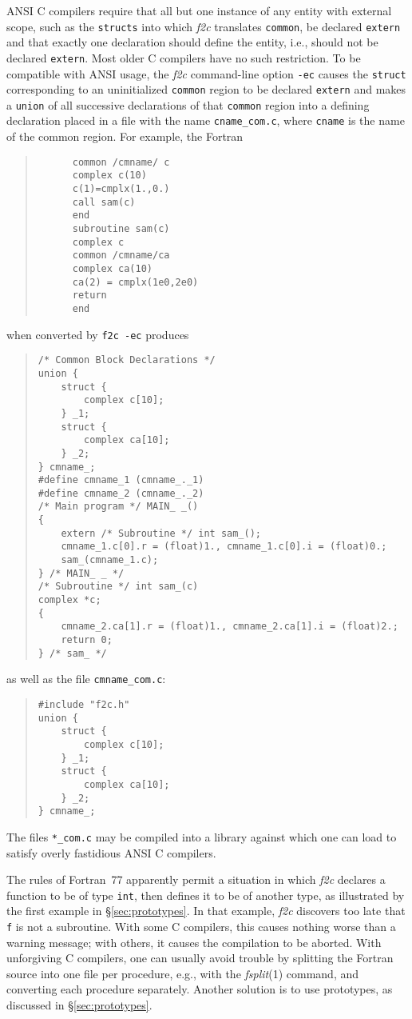 \documentclass[10pt,a4paper]{article}
\begin{document}
ANSI C compilers require that all but one instance of any entity with external scope, such as the \verb|structs| into which \emph{f2c} translates \verb|common|, be declared \verb|extern| and that exactly one declaration should define the entity, i.e., should not be declared \verb|extern|. Most older C compilers have no such restriction. To be compatible with ANSI usage, the \emph{f2c} command-line option \verb|-ec| causes the \verb|struct| corresponding to an uninitialized \verb|common| region to be declared \verb|extern| and makes a \verb|union| of all successive declarations of that \verb|common| region into a defining declaration placed in a file with the name \verb|cname_com.c|, where \verb|cname| is the name of the common region. For example, the Fortran
\begin{quote}
\begin{verbatim}
      common /cmname/ c
      complex c(10)
      c(1)=cmplx(1.,0.)
      call sam(c)
      end
      subroutine sam(c)
      complex c
      common /cmname/ca
      complex ca(10)
      ca(2) = cmplx(1e0,2e0)
      return
      end
\end{verbatim}
\end{quote}
when converted by \verb|f2c -ec| produces
\begin{quote}
\begin{verbatim}
/* Common Block Declarations */
union {
    struct {
        complex c[10];
    } _1;
    struct {
        complex ca[10];
    } _2;
} cmname_;
#define cmname_1 (cmname_._1)
#define cmname_2 (cmname_._2)
/* Main program */ MAIN_ _()
{
    extern /* Subroutine */ int sam_();
    cmname_1.c[0].r = (float)1., cmname_1.c[0].i = (float)0.;
    sam_(cmname_1.c);
} /* MAIN_ _ */
/* Subroutine */ int sam_(c)
complex *c;
{
    cmname_2.ca[1].r = (float)1., cmname_2.ca[1].i = (float)2.;
    return 0;
} /* sam_ */
\end{verbatim}
\end{quote}
as well as the file \verb|cmname_com.c|:
\begin{quote}
\begin{verbatim}
#include "f2c.h"
union {
    struct {
        complex c[10];
    } _1;
    struct {
        complex ca[10];
    } _2;
} cmname_;
\end{verbatim}
\end{quote}
The files \verb|*_com.c| may be compiled into a library against which one can load to satisfy overly fastidious ANSI C compilers.

The rules of Fortran~77 apparently permit a situation in which \emph{f2c} declares a function to be of type \verb|int|, then defines it to be of another type, as illustrated by the first example in §\ref{sec:prototypes}. In that example, \emph{f2c} discovers too late that \verb|f| is not a subroutine. With some C compilers, this causes nothing worse than a warning message; with others, it causes the compilation to be aborted. With unforgiving C compilers, one can usually avoid trouble by splitting the Fortran source into one file per procedure, e.g., with the \emph{fsplit}(1) command, and converting each procedure separately. Another solution is to use prototypes, as discussed in §\ref{sec:prototypes}.
\end{document}

